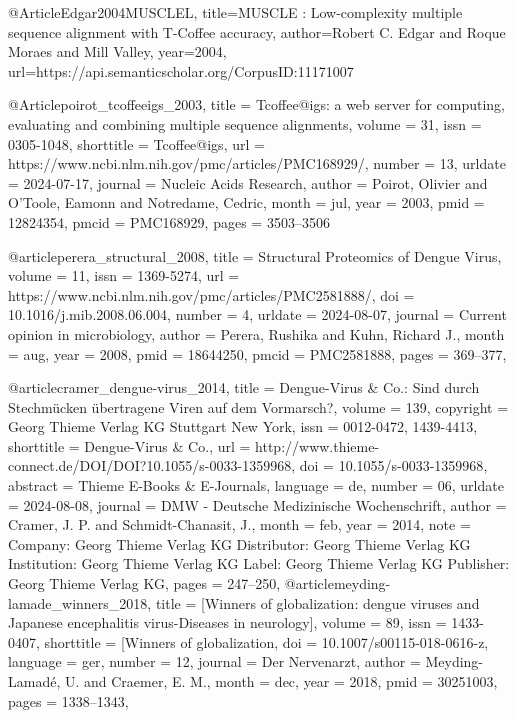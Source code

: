 \documentclass[german,version-2022-01]{uzl-thesis}
\begin{document}
%

\begin{bibtex-entries}

@Article{Edgar2004MUSCLEL,
  title={MUSCLE : Low-complexity multiple sequence alignment with T-Coffee accuracy},
  author={Robert C. Edgar and Roque Moraes and Mill Valley},
  year={2004},
  url={https://api.semanticscholar.org/CorpusID:11171007}
}

@Article{poirot_tcoffeeigs_2003,
	title = {Tcoffee@igs: a web server for computing, evaluating and combining multiple sequence alignments},
	volume = {31},
	issn = {0305-1048},
	shorttitle = {Tcoffee@igs},
	url = {https://www.ncbi.nlm.nih.gov/pmc/articles/PMC168929/},
	number = {13},
	urldate = {2024-07-17},
	journal = {Nucleic Acids Research},
	author = {Poirot, Olivier and O'Toole, Eamonn and Notredame, Cedric},
	month = jul,
	year = {2003},
	pmid = {12824354},
	pmcid = {PMC168929},
	pages = {3503--3506}
}

@article{perera_structural_2008,
	title = {Structural {Proteomics} of {Dengue} {Virus}},
	volume = {11},
	issn = {1369-5274},
	url = {https://www.ncbi.nlm.nih.gov/pmc/articles/PMC2581888/},
	doi = {10.1016/j.mib.2008.06.004},
	number = {4},
	urldate = {2024-08-07},
	journal = {Current opinion in microbiology},
	author = {Perera, Rushika and Kuhn, Richard J.},
	month = aug,
	year = {2008},
	pmid = {18644250},
	pmcid = {PMC2581888},
	pages = {369--377},
}

@article{cramer_dengue-virus_2014,
	title = {Dengue-{Virus} \& {Co}.: {Sind} durch {Stechm\"ucken} \"ubertragene {Viren} auf dem {Vormarsch}?},
	volume = {139},
	copyright = {\textcopyright Georg Thieme Verlag KG Stuttgart \cdot New York},
	issn = {0012-0472, 1439-4413},
	shorttitle = {Dengue-{Virus} \& {Co}.},
	url = {http://www.thieme-connect.de/DOI/DOI?10.1055/s-0033-1359968},
	doi = {10.1055/s-0033-1359968},
	abstract = {Thieme E-Books \& E-Journals},
	language = {de},
	number = {06},
	urldate = {2024-08-08},
	journal = {DMW - Deutsche Medizinische Wochenschrift},
	author = {Cramer, J. P. and Schmidt-Chanasit, J.},
	month = feb,
	year = {2014},
	note = {Company: \textcopyright Georg Thieme Verlag KG
Distributor: \textcopyright Georg Thieme Verlag KG
Institution: \textcopyright Georg Thieme Verlag KG
Label: \textcopyright Georg Thieme Verlag KG
Publisher: \textcopyright Georg Thieme Verlag KG},
	pages = {247--250},
}
@article{meyding-lamade_winners_2018,
	title = {[{Winners} of globalization: dengue viruses and {Japanese} encephalitis virus-{Diseases} in neurology]},
	volume = {89},
	issn = {1433-0407},
	shorttitle = {[{Winners} of globalization},
	doi = {10.1007/s00115-018-0616-z},
	language = {ger},
	number = {12},
	journal = {Der Nervenarzt},
	author = {Meyding-Lamad\'e, U. and Craemer, E. M.},
	month = dec,
	year = {2018},
	pmid = {30251003},
	pages = {1338--1343},
}


\end{bibtex-entries}
\end{document}
